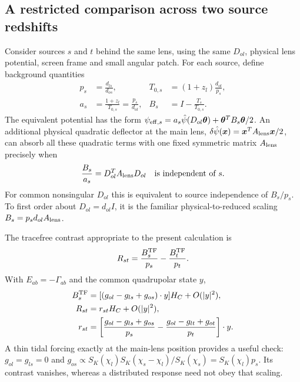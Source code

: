 \subsection{A restricted comparison across two source redshifts}

Consider sources $s$ and $t$ behind the same lens, using the same $D_{ol}$,
physical lens potential, screen frame and small angular patch. For each
source, define background quantities
\begin{align}
 p_s&=\frac{d_{ls}}{d_{os}},&
 T_{0,s}&=(1+z_l)\frac{d_{ol}}{p_s},\nonumber\\
 a_s&=\frac{1+z_l}{T_{0,s}}=\frac{p_s}{d_{ol}},&
 B_s&=I-\frac{T_s}{T_{0,s}}.
 \label{eq:representation-source-scaling}
\end{align}
The equivalent potential has the form
$\psi_{{\rm eff},s}=a_s\hat\psi(D_{ol}\boldsymbol\theta)
+\boldsymbol\theta^TB_s\boldsymbol\theta/2$.
An additional physical quadratic deflector at the main lens,
$\delta\hat\psi(\boldsymbol x)=\boldsymbol x^TA_{\rm lens}\boldsymbol x/2$,
can absorb all these quadratic terms with one fixed symmetric matrix
$A_{\rm lens}$ precisely when
\begin{equation}
 \frac{B_s}{a_s}=D_{ol}^TA_{\rm lens}D_{ol}
 \quad\hbox{is independent of }s.
 \label{eq:representation-physical-quadratic}
\end{equation}
For common nonsingular $D_{ol}$ this is equivalent to source independence
of $B_s/p_s$. To first order about $D_{ol}=d_{ol}I$, it is the familiar
physical-to-reduced scaling $B_s=p_s d_{ol}A_{\rm lens}$.

The tracefree contrast appropriate to the present calculation is
\begin{equation}
 R_{st}=\frac{B_s^{\rm TF}}{p_s}-\frac{B_t^{\rm TF}}{p_t}.
 \label{eq:representation-redshift-contrast}
\end{equation}
With $E_{ab}=-\Gamma_{ab}$ and the common quadrupolar state $y$,
\begin{align}
 B_s^{\rm TF}
   &=[(g_{ol}-g_{ls}+g_{os})\cdot y]H_C+O(|y|^2),\nonumber\\
 R_{st}&=r_{st}H_C+O(|y|^2),\nonumber\\
 r_{st}&=\left[
 \frac{g_{ol}-g_{ls}+g_{os}}{p_s}
 -\frac{g_{ol}-g_{lt}+g_{ot}}{p_t}
 \right]\cdot y.
 \label{eq:representation-state-contrast}
\end{align}
A thin tidal forcing exactly at the main-lens position provides a useful
check: $g_{ol}=g_{ls}=0$ and
$g_{os}\propto S_K(\chi_l)S_K(\chi_s-\chi_l)/S_K(\chi_s)
=S_K(\chi_l)p_s$. Its contrast vanishes, whereas a distributed response
need not obey that scaling.

